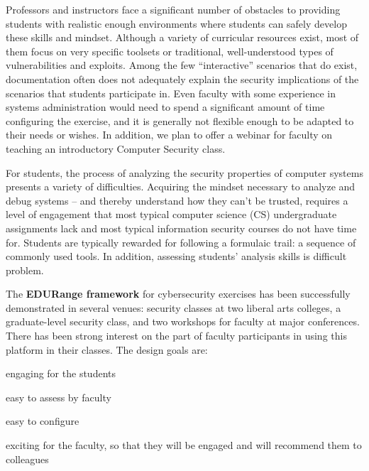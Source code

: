  Professors and instructors face a significant number of
obstacles to providing students with realistic enough environments
where students can safely develop these skills and mindset.  Although
a variety of curricular resources exist, most of them focus on very specific
toolsets or traditional, well-understood types of vulnerabilities and
exploits.  Among the few ``interactive'' scenarios that do exist, documentation
 often  does not adequately explain the
security implications of the scenarios that students participate in.  Even faculty
with some experience in systems administration would need to 
spend a significant amount of time configuring the exercise, and it is 
generally not flexible enough to be adapted to their needs or wishes.
In addition, we plan to offer a webinar for faculty on teaching an introductory 
Computer Security class.

For students, the process of analyzing the security
properties of computer systems presents a variety of difficulties.
Acquiring the mindset necessary to analyze and debug systems -- and
thereby understand how they can't be trusted, requires a level
of engagement that most typical computer science (CS) undergraduate assignments lack and
most typical information security courses do not have time for.  
Students are typically rewarded for following a formulaic trail: a sequence
of commonly used tools.  In addition, assessing students' analysis skills is  difficult 
problem.


The {\bf EDURange framework} for cybersecurity exercises has been successfully demonstrated 
in several venues: security classes at two liberal arts colleges, a graduate-level security class, and
two workshops for faculty at major conferences.  There has been strong interest on the part of
faculty participants in using this platform in their classes.  The design goals are:
\begin{packenum}
\item engaging for the students
\item easy to assess by faculty
\item easy to configure
\item exciting for the faculty, so that they will be engaged and will recommend them
  to colleagues
\end{packenum}

